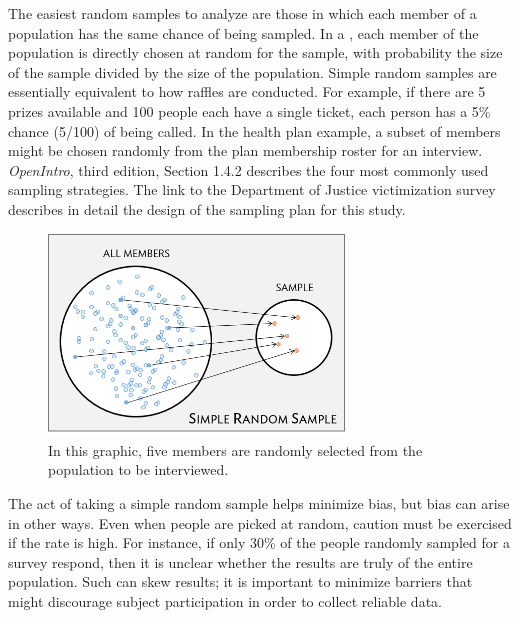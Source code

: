 \begin{doublespace}
The easiest random samples to analyze are those in which each member of a population has the same chance of being sampled. In a , each member of the population is directly chosen at random for the sample, with probability the size of the sample divided by the size of the population. Simple random samples are essentially equivalent to how raffles are conducted. For example, if there are 5 prizes available and 100 people each have a single ticket, each person has a 5\% chance (5/100) of being called. In the health plan example, a subset of members might be chosen randomly from the plan membership roster for an interview. \textsl{OpenIntro}, third edition, Section 1.4.2 describes the four most commonly used sampling strategies. The link to the Department of Justice victimization survey describes in detail the design of the sampling plan for this study.

\begin{figure}[ht]
	\centering
	\includegraphics[width=0.70\textwidth]{ch_intro_to_data_oi_biostat/figures/sampleHealthPlan/sampleRandomHealthPlan.png}
	\caption{In this graphic, five members are randomly selected from the population to be interviewed.}
	\label{sampleRandomHealthPlan}
\end{figure}

The act of taking a simple random sample helps minimize bias, but bias can arise in other ways. Even when people are picked at random, caution must be exercised if the  rate  is high. For instance, if only 30\% of the people randomly sampled for a survey respond, then it is unclear whether the results are truly  of the entire population. Such   can skew results; it is important to minimize barriers that might discourage subject participation in order to collect reliable data.


\end{doublespace}
